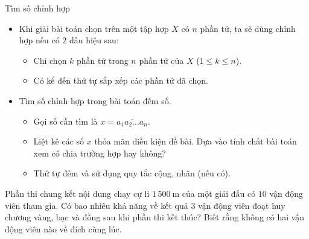 \begin{dang}{Tìm số chỉnh hợp}
	\begin{itemize}
		\item[1.] Khi giải bài toán chọn trên một tập hợp $X$ có $n$ phần tử, ta sẽ dùng chỉnh hợp nếu có $2$ dấu hiệu sau:
		\begin{itemize}
			\item Chỉ chọn $k$ phần tử trong $n$ phần tử của $X$ ($1\le k\le n$).
			\item Có kể đến thứ tự sắp xếp các phần tử đã chọn.
		\end{itemize}
		\item[2.]Tìm số chỉnh hợp trong bài toán đếm số. 
		\begin{itemize}
			\item Gọi số cần tìm là $x=\overline{a_1a_2\ldots a_n}$.
			\item Liệt kê các số $x$ thỏa mãn điều kiện đề bài. Dựa vào tính chất bài toán xem có chia trường hợp hay không?
			\item Thứ tự đếm và sử dụng quy tắc cộng, nhân (nếu có).
		\end{itemize}
	\end{itemize}
\end{dang}
\begin{vd}
	Phần thi chung kết nội dung chạy cự li $1\,500 \mathrm{~m}$ của một giải đấu có $10$ vận động viên tham gia. Có bao nhiêu khả năng về kết quả $3$ vận động viên đoạt huy chương vàng, bạc và đồng sau khi phần thi kết thúc? Biết rằng không có hai vận động viên nào về đích cùng lúc.
\end{vd}
